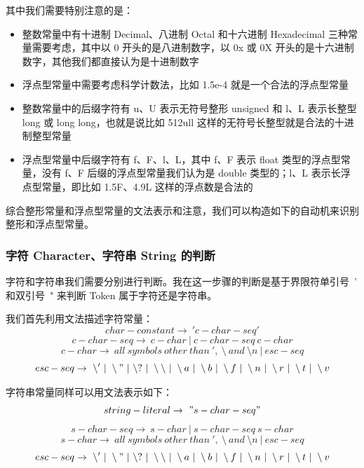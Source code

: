 \documentclass[UTF8]{ctexart}
\begin{document}
其中我们需要特别注意的是：
\begin{itemize}
  \item 整数常量中有十进制 Decimal、八进制 Octal 和十六进制 Hexadecimal 三种常量需要考虑，其中以 0 开头的是八进制数字，以 0x 或 0X 开头的是十六进制数字，其他我们都直接认为是十进制数字
  \item 浮点型常量中需要考虑科学计数法，比如 1.5e-4 就是一个合法的浮点型常量
  \item 整数常量中的后缀字符有 u、U 表示无符号整形 unsigned 和 l、L 表示长整型 long 或 long long，也就是说比如 512ull 这样的无符号长整型就是合法的十进制整型常量
  \item 浮点型常量中后缀字符有 f、F、l、L，其中 f、F 表示 float 类型的浮点型常量，没有 f、F 后缀的浮点型常量我们认为是 double 类型的；l、L 表示长浮点型常量，即比如 1.5F、4.9L 这样的浮点数是合法的
\end{itemize}

综合整形常量和浮点型常量的文法表示和注意，我们可以构造如下的自动机来识别整形和浮点型常量。

\subsubsection{字符 Character、字符串 String 的判断}
字符和字符串我们需要分别进行判断。我在这一步骤的判断是基于界限符单引号\ ' 和双引号\ " 来判断 Token 属于字符还是字符串。

我们首先利用文法描述字符常量：
\begin{equation}
  char-constant \rightarrow\ 'c-char-seq'
\end{equation}
\begin{equation}
  c-char-seq \rightarrow\ c-char\ |\ c-char-seq\ c-char
\end{equation}
\begin{equation}
  c-char \rightarrow\ all\ symbols\ other\ than\ ', \ \setminus\ and\ \setminus n\ |\ esc-seq
\end{equation}
\begin{equation}
  esc-seq \rightarrow\ \setminus'\ |\ \setminus"\ |\ \setminus?\ |\ \setminus\setminus\ |\ \setminus a\ |\ \setminus b\ |\ \setminus f\ |\ \setminus n\ |\ \setminus r\ |\ \setminus t\ |\ \setminus v
\end{equation}

字符串常量同样可以用文法表示如下：
\begin{equation}
  string-literal \rightarrow\ "s-char-seq"
\end{equation}
\begin{equation}
  s-char-seq \rightarrow\ s-char\ |\ s-char-seq\ s-char
\end{equation}
\begin{equation}
  s-char \rightarrow\ all\ symbols\ other\ than\ ', \ \setminus\ and\ \setminus n\ |\ esc-seq
\end{equation}
\begin{equation}
  esc-seq \rightarrow\ \setminus'\ |\ \setminus"\ |\ \setminus?\ |\ \setminus\setminus\ |\ \setminus a\ |\ \setminus b\ |\ \setminus f\ |\ \setminus n\ |\ \setminus r\ |\ \setminus t\ |\ \setminus v
\end{equation}
\end{document}
